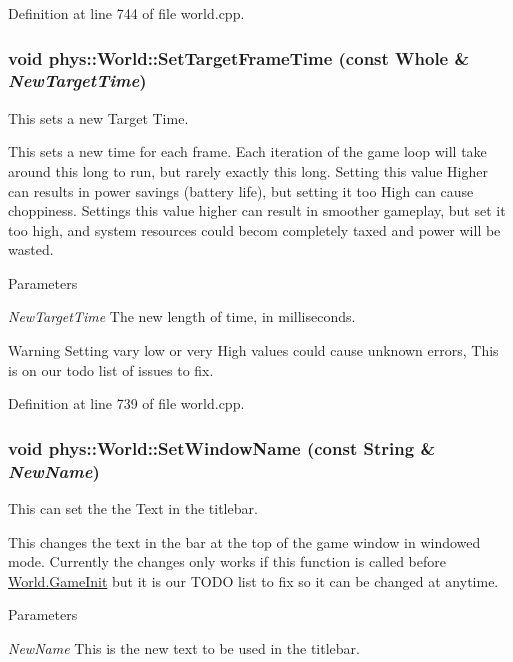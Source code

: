 Definition at line 744 of file world.cpp.

\hypertarget{classphys_1_1World_ad95b5a5ad73e0a05826b5bd834876333}{
\subsubsection[{SetTargetFrameTime}]{\setlength{\rightskip}{0pt plus 5cm}void phys::World::SetTargetFrameTime (const {\bf Whole} \& {\em NewTargetTime})}}
\label{da/ddf/classphys_1_1World_ad95b5a5ad73e0a05826b5bd834876333}


This sets a new Target Time. 

This sets a new time for each frame. Each iteration of the game loop will take around this long to run, but rarely exactly this long. Setting this value Higher can results in power savings (battery life), but setting it too High can cause choppiness. Settings this value higher can result in smoother gameplay, but set it too high, and system resources could becom completely taxed and power will be wasted. 
\begin{DoxyParams}{Parameters}
\item[{\em NewTargetTime}]The new length of time, in milliseconds. \end{DoxyParams}
\begin{DoxyWarning}{Warning}
Setting vary low or very High values could cause unknown errors, This is on our todo list of issues to fix. 
\end{DoxyWarning}


Definition at line 739 of file world.cpp.

\hypertarget{classphys_1_1World_acd0dff342c08fe3008226488b7c53d97}{
\subsubsection[{SetWindowName}]{\setlength{\rightskip}{0pt plus 5cm}void phys::World::SetWindowName (const {\bf String} \& {\em NewName})}}
\label{da/ddf/classphys_1_1World_acd0dff342c08fe3008226488b7c53d97}


This can set the the Text in the titlebar. 

This changes the text in the bar at the top of the game window in windowed mode. Currently the changes only works if this function is called before \hyperlink{classphys_1_1World_a21cc36be08a61f40619584d4c438936b}{World.GameInit} but it is our TODO list to fix so it can be changed at anytime. 
\begin{DoxyParams}{Parameters}
\item[{\em NewName}]This is the new text to be used in the titlebar. \end{DoxyParams}


